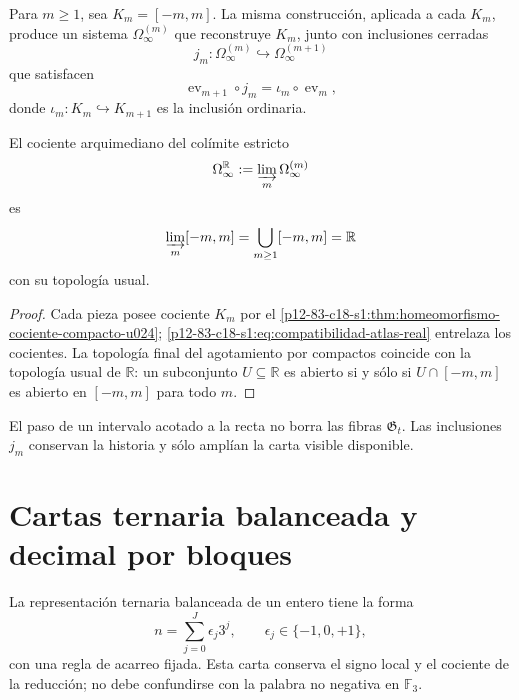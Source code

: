 Para \(m\geq1\), sea \(K_m=[-m,m]\). La misma construcción, aplicada a cada
\(K_m\), produce un sistema \(\Omega_\infty^{(m)}\) que reconstruye
\(K_m\), junto con inclusiones cerradas
\begin{equation}
 j_m:\Omega_\infty^{(m)}\hookrightarrow
 \Omega_\infty^{(m+1)}
 \label{p12-83-c18-s1:eq:inclusion-atlas-genealogico}
\end{equation}
que satisfacen
\begin{equation}
 \operatorname{ev}_{m+1}\circ j_m
 =\iota_m\circ\operatorname{ev}_m,
 \label{p12-83-c18-s1:eq:compatibilidad-atlas-real}
\end{equation}
donde \(\iota_m:K_m\hookrightarrow K_{m+1}\) es la inclusión ordinaria.

\begin{proposition}
\label{p12-83-c18-s1:prop:agotamiento-recta-real-u024}
El cociente arquimediano del colímite estricto
\begin{equation}
 \Omega_\infty^{\mathbb R}
 :=\varinjlim_m\Omega_\infty^{(m)}
 \label{p12-83-c18-s1:eq:colimite-historias-recta}
\end{equation}
es
\begin{equation}
 \varinjlim_m[-m,m]
 =\bigcup_{m\geq1}[-m,m]
 =\mathbb R
 \label{p12-83-c18-s1:eq:colimite-compactos-recta}
\end{equation}
con su topología usual.
\end{proposition}

\begin{proof}
Cada pieza posee cociente \(K_m\) por el
\cref{p12-83-c18-s1:thm:homeomorfismo-cociente-compacto-u024};
\eqref{p12-83-c18-s1:eq:compatibilidad-atlas-real} entrelaza los cocientes. La topología
final del agotamiento por compactos coincide con la topología usual de
\(\mathbb R\): un subconjunto \(U\subseteq\mathbb R\) es abierto si y sólo
si \(U\cap[-m,m]\) es abierto en \([-m,m]\) para todo \(m\).
\end{proof}

El paso de un intervalo acotado a la recta no borra las fibras
\(\mathfrak G_t\). Las inclusiones \(j_m\) conservan la historia y sólo
amplían la carta visible disponible.

\section{Cartas ternaria balanceada y decimal por bloques}

La representación ternaria balanceada de un entero tiene la forma
\begin{equation}
 n=\sum_{j=0}^{J}\epsilon_j3^j,
 \qquad
 \epsilon_j\in\{-1,0,+1\},
 \label{p12-83-c18-s1:eq:carta-ternaria-balanceada-u024}
\end{equation}
con una regla de acarreo fijada. Esta carta conserva el signo local y el
cociente de la reducción; no debe confundirse con la palabra no negativa en
\(\mathbb F_3\).

